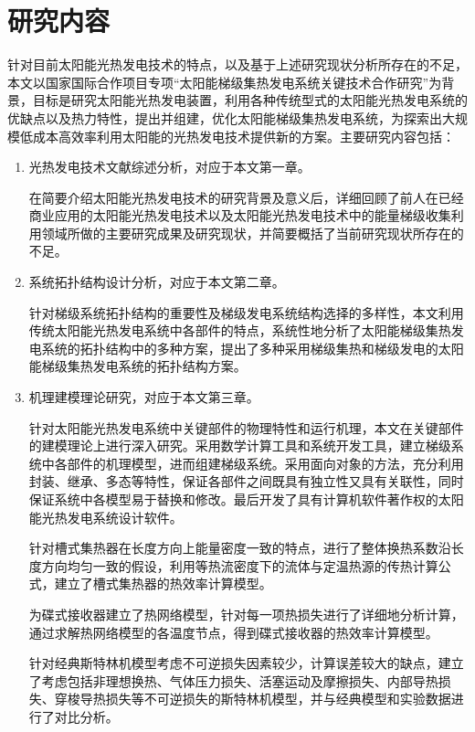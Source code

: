 \section{研究内容}
\label{sec:researchContent}

针对目前太阳能光热发电技术的特点，以及基于上述研究现状分析所存在的不足，本文以国家国际合作项目专项“太阳能梯级集热发电系统关键技术合作研究”为背景，目标是研究太阳能光热发电装置，利用各种传统型式的太阳能光热发电系统的优缺点以及热力特性，提出并组建，优化太阳能梯级集热发电系统，为探索出大规模低成本高效率利用太阳能的光热发电技术提供新的方案。主要研究内容包括：

\begin{enumerate}[label=(\arabic*)]
	
	\item 光热发电技术文献综述分析，对应于本文第一章。
	\setlength\parindent{2em}
	
	在简要介绍太阳能光热发电技术的研究背景及意义后，详细回顾了前人在已经商业应用的太阳能光热发电技术以及太阳能光热发电技术中的能量梯级收集利用领域所做的主要研究成果及研究现状，并简要概括了当前研究现状所存在的不足。
	\item 系统拓扑结构设计分析，对应于本文第二章。
	
	针对梯级系统拓扑结构的重要性及梯级发电系统结构选择的多样性，本文利用传统太阳能光热发电系统中各部件的特点，系统性地分析了太阳能梯级集热发电系统的拓扑结构中的多种方案，提出了多种采用梯级集热和梯级发电的太阳能梯级集热发电系统的拓扑结构方案。 

	\item 机理建模理论研究，对应于本文第三章。
	
	针对太阳能光热发电系统中关键部件的物理特性和运行机理，本文在关键部件的建模理论上进行深入研究。采用数学计算工具和系统开发工具，建立梯级系统中各部件的机理模型，进而组建梯级系统。采用面向对象的方法，充分利用封装、继承、多态等特性，保证各部件之间既具有独立性又具有关联性，同时保证系统中各模型易于替换和修改。最后开发了具有计算机软件著作权的太阳能光热发电系统设计软件。
	
	针对槽式集热器在长度方向上能量密度一致的特点，进行了整体换热系数沿长度方向均匀一致的假设，利用等热流密度下的流体与定温热源的传热计算公式，建立了槽式集热器的热效率计算模型。
	
	为碟式接收器建立了热网络模型，针对每一项热损失进行了详细地分析计算，通过求解热网络模型的各温度节点，得到碟式接收器的热效率计算模型。
	
	针对经典斯特林机模型考虑不可逆损失因素较少，计算误差较大的缺点，建立了考虑包括非理想换热、气体压力损失、活塞运动及摩擦损失、内部导热损失、穿梭导热损失等不可逆损失的斯特林机模型，并与经典模型和实验数据进行了对比分析。
	

\end{enumerate}
